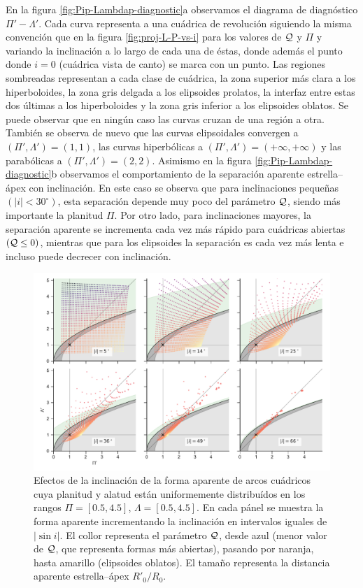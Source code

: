En la figura \ref{fig:Pip-Lambdap-diagnostic}a observamos el diagrama de diagnóstico $\Pi'-\Lambda'$. Cada curva representa a una cuádrica de revolución siguiendo la misma convención que en la figura \ref{fig:proj-L-P-vs-i} para los valores de $\mathcal{Q}$ y $\Pi$ y variando la inclinación a lo largo de cada una de éstas, donde además el punto donde $i=0$ (cuádrica vista de canto) se marca con un punto. Las regiones sombreadas representan a cada clase de cuádrica, la zona superior más clara a los hiperboloides, la zona gris delgada a los elipsoides prolatos, la interfaz entre estas dos últimas a los hiperboloides y la zona gris inferior a los elipsoides oblatos. Se puede observar que en ningún caso las curvas cruzan de una región a otra. También se observa de nuevo que las curvas elipsoidales convergen a $(\Pi', \Lambda') = (1, 1)$, las curvas hiperbólicas a $(\Pi', \Lambda') = (+\infty, +\infty)$ y las parabólicas a $(\Pi', \Lambda') = (2, 2)$. Asimismo en la figura \ref{fig:Pip-Lambdap-diagnostic}b observamos el comportamiento de la separación aparente estrella--ápex con inclinación. En este caso se observa que para inclinaciones pequeñas $(|i| < 30^\circ)$, esta separación depende muy poco del parámetro $\mathcal{Q}$, siendo más importante la planitud $\Pi$. Por otro lado, para inclinaciones mayores, la separación aparente se incrementa cada vez más rápido para cuádricas abiertas $(\mathcal{Q} \leq 0)$, mientras que para los elipsoides la separación es cada vez más lenta e incluso puede decrecer con inclinación.

\begin{figure}
  \includegraphics[width=\linewidth]{./Figures/projected-R90-Rc-snapshots}
  \caption{Efectos de la inclinación de la forma aparente de arcos cuádricos cuya planitud y alatud están uniformemente distribuídos en los rangos $\Pi = [0.5, 4.5]$, $\Lambda = [0.5, 4.5]$. En cada pánel se muestra la forma aparente incrementando la inclinación en intervalos iguales de $|\sin i|$. El collor representa el parámetro $\mathcal{Q}$, desde azul (menor valor de $\mathcal{Q}$, que representa formas más abiertas), pasando por naranja, hasta amarillo (elipsoides oblatos). El tamaño representa la distancia aparente estrella--ápex $R'_0/R_0$.}
  \label{fig:snapshots}
\end{figure}


